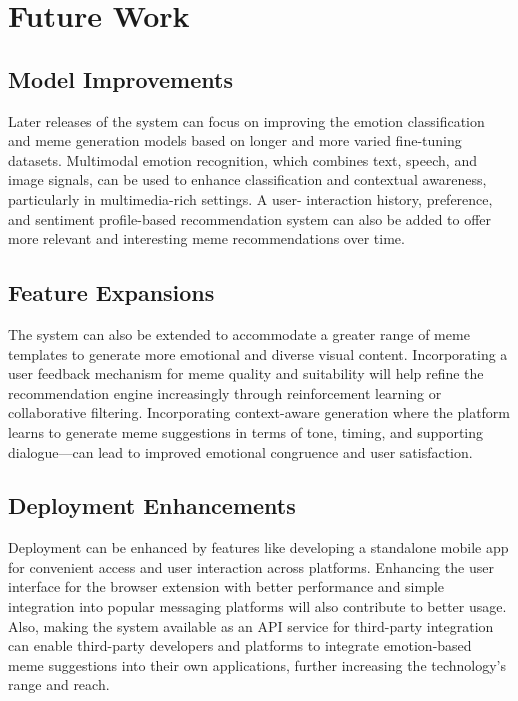 \documentclass[conference]{IEEEtran}
\begin{document}
%

\section{Future Work}
\subsection{Model Improvements}
Later releases of the system can focus on improving the emotion classification and meme generation models based on longer and more varied fine-tuning datasets. Multimodal emotion recognition, which combines text, speech, and image signals, can be used to enhance classification and contextual awareness, particularly in multimedia-rich settings. A user- interaction history, preference, and sentiment profile-based recommendation system can also be added to offer more relevant and interesting meme recommendations over time.

\subsection{Feature Expansions}
The system can also be extended to accommodate a greater range of meme templates to generate more emotional and diverse visual content. Incorporating a user feedback mechanism for meme quality and suitability will help refine the recommendation engine increasingly through reinforcement learning or collaborative filtering. Incorporating context-aware generation where the platform learns to generate meme suggestions in terms of tone, timing, and supporting dialogue—can lead to improved emotional congruence and user satisfaction.

\subsection{Deployment Enhancements}
Deployment can be enhanced by features like developing a standalone mobile app for convenient access and user interaction across platforms. Enhancing the user interface for the browser extension with better performance and simple integration into popular messaging platforms will also contribute to better usage. Also, making the system available as an API service for third-party integration can enable third-party developers and platforms to integrate emotion-based meme suggestions into their own applications, further increasing the technology’s range and reach.
\end{document}
